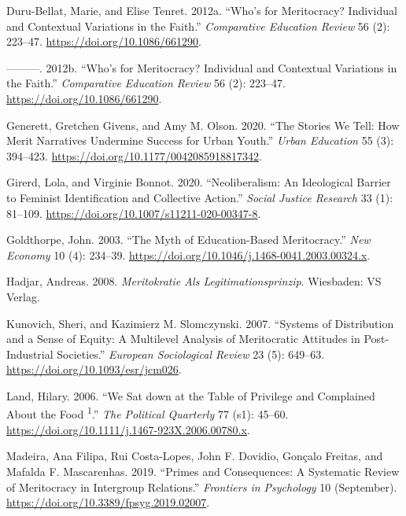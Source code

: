 \documentclass[
]{article}
\begin{document}
\leavevmode\hypertarget{ref-Duru-BellatWhoMeritocracyIndividual2012b}{}%
Duru-Bellat, Marie, and Elise Tenret. 2012a. ``Who's for Meritocracy?
Individual and Contextual Variations in the Faith.'' \emph{Comparative
Education Review} 56 (2): 223--47. \url{https://doi.org/10.1086/661290}.

\leavevmode\hypertarget{ref-duru-bellat_whos_2012}{}%
---------. 2012b. ``Who's for Meritocracy? Individual and Contextual
Variations in the Faith.'' \emph{Comparative Education Review} 56 (2):
223--47. \url{https://doi.org/10.1086/661290}.

\leavevmode\hypertarget{ref-GenerettStoriesWeTell2020}{}%
Generett, Gretchen Givens, and Amy M. Olson. 2020. ``The Stories We
Tell: How Merit Narratives Undermine Success for Urban Youth.''
\emph{Urban Education} 55 (3): 394--423.
\url{https://doi.org/10.1177/0042085918817342}.

\leavevmode\hypertarget{ref-GirerdNeoliberalismIdeologicalBarrier2020}{}%
Girerd, Lola, and Virginie Bonnot. 2020. ``Neoliberalism: An Ideological
Barrier to Feminist Identification and Collective Action.'' \emph{Social
Justice Research} 33 (1): 81--109.
\url{https://doi.org/10.1007/s11211-020-00347-8}.

\leavevmode\hypertarget{ref-goldthorpe_myth_2003}{}%
Goldthorpe, John. 2003. ``The Myth of Education-Based Meritocracy.''
\emph{New Economy} 10 (4): 234--39.
\url{https://doi.org/10.1046/j.1468-0041.2003.00324.x}.

\leavevmode\hypertarget{ref-hadjar_meritokratie_2008}{}%
Hadjar, Andreas. 2008. \emph{Meritokratie Als Legitimationsprinzip}.
Wiesbaden: VS Verlag.

\leavevmode\hypertarget{ref-kunovich_systems_2007}{}%
Kunovich, Sheri, and Kazimierz M. Slomczynski. 2007. ``Systems of
Distribution and a Sense of Equity: A Multilevel Analysis of
Meritocratic Attitudes in Post-Industrial Societies.'' \emph{European
Sociological Review} 23 (5): 649--63.
\url{https://doi.org/10.1093/esr/jcm026}.

\leavevmode\hypertarget{ref-landWeSatTable2006}{}%
Land, Hilary. 2006. ``We Sat down at the Table of Privilege and
Complained About the Food \textsuperscript{1}.'' \emph{The Political
Quarterly} 77 (s1): 45--60.
\url{https://doi.org/10.1111/j.1467-923X.2006.00780.x}.

\leavevmode\hypertarget{ref-MadeiraPrimesConsequencesSystematic2019}{}%
Madeira, Ana Filipa, Rui Costa-Lopes, John F. Dovidio, Gonçalo Freitas,
and Mafalda F. Mascarenhas. 2019. ``Primes and Consequences: A
Systematic Review of Meritocracy in Intergroup Relations.''
\emph{Frontiers in Psychology} 10 (September).
\url{https://doi.org/10.3389/fpsyg.2019.02007}.
\end{document}
